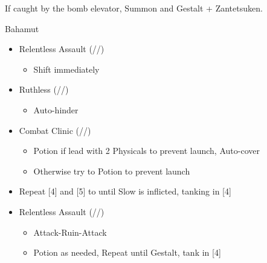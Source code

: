\begin{multicols}{2}
\begin{menu}
\end{menu}
If caught by the bomb elevator, Summon and Gestalt + Zantetsuken. 
\renewcommand{\first}{[1] Relentless Assault (\com/\rav/\rav)}
\renewcommand{\fifth}{[5] Ruthless (\sab/\com/\rav)
\renewcommand{\fourth}{[4] Combat Clinic (\sen/\med/\med)}}
\begin{battle}{Bahamut}

\begin{itemize}
    \item \first
    \begin{itemize}
        \item Shift immediately
    \end{itemize}
    \item \fifth
    \begin{itemize}
        \item Auto-hinder
    \end{itemize}
    \item \fourth
    \begin{itemize}
        \item Potion if lead with 2 Physicals to prevent launch, Auto-cover
        \item Otherwise try to Potion to prevent launch
    \end{itemize}
    
    \item Repeat [4] and [5] to until Slow is inflicted, tanking in [4]
    \item \first
    \begin{itemize}
        \item Attack-Ruin-Attack
        \item Potion as needed, Repeat until Gestalt, tank in [4]
    \end{itemize}
\end{itemize}

\end{battle}
\end{multicols}
